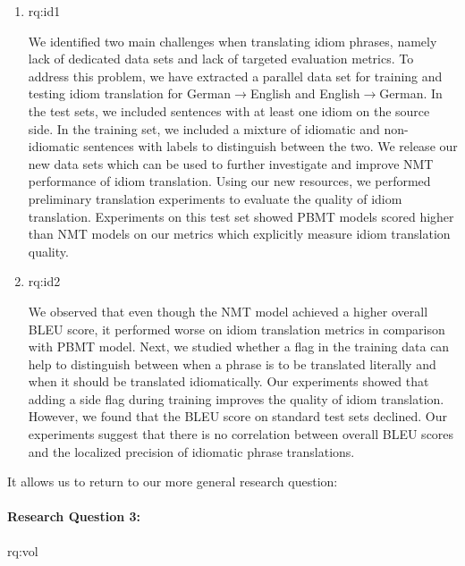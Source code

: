 
\begin{enumerate}[label=\textbf{RQ3.\arabic* },wide = 0pt, leftmargin=2em]
\setlength\itemsep{1em}
\item \acl{rq:id1}

\medskip

\noindent We identified two main challenges when translating idiom phrases, namely lack of dedicated data sets and lack of targeted evaluation metrics.
To address this problem, we have extracted a parallel data set for training and testing idiom translation for German$\rightarrow$English and English$\rightarrow$German.
%
In the test sets, we included sentences with at least one idiom on the source side.
In the training set, we included a mixture of idiomatic and non-idiomatic sentences with labels to distinguish between the two.
We release our new data sets which can be used to further investigate and improve NMT performance of idiom translation.
Using our new resources, we performed preliminary translation experiments to evaluate the quality of idiom translation.
Experiments on this test set showed PBMT models scored higher than NMT models on our metrics which explicitly measure idiom translation quality. 

\item \acl{rq:id2}

\medskip

\noindent We observed that even though the NMT model achieved a higher overall BLEU score, it performed worse on idiom translation metrics in comparison with PBMT model.
Next, we studied whether a flag in the training data can help to distinguish between when a phrase is to be translated literally and when it should be translated idiomatically.
Our experiments showed that adding a side flag during training improves the quality of idiom translation.
However, we found that the BLEU score on standard test sets declined.
Our experiments suggest that there is no correlation between overall BLEU scores and the localized precision of idiomatic phrase translations.

%

\end{enumerate}

 \noindent It allows us to return to our more general research question:

\paragraph{Research Question 3:} \acl{rq:vol} 

